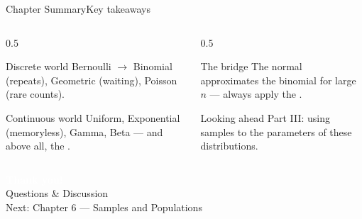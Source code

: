 \documentclass[aspectratio=169,11pt]{beamer}
\begin{document}
\begin{frame}{Chapter Summary}{Key takeaways}
  \begin{columns}[T]
    \begin{column}{0.5\textwidth}
      \begin{block}{Discrete world}
        \small Bernoulli $\to$ Binomial (repeats), Geometric (waiting),
        Poisson (rare counts).
      \end{block}
      \begin{exampleblock}{Continuous world}
        \small Uniform, Exponential (memoryless), Gamma, Beta — and above
        all, the .
      \end{exampleblock}
    \end{column}
    \begin{column}{0.5\textwidth}
      \begin{alertblock}{The bridge}
        \small The normal approximates the binomial for large $n$ — always
        apply the .
      \end{alertblock}
      \begin{block}{Looking ahead}
        \small Part III: using samples to  the parameters of
        these distributions.
      \end{block}
    \end{column}
  \end{columns}
\end{frame}

{
\begin{frame}
  \vfill
  \begin{center}
    {\LARGE\textcolor{white}{\textbf{Thank you!}}}\\[0.6em]
    {\small\textcolor{PrimaryLight}{Questions \& Discussion}}\\[1.2em]
    {\footnotesize\textcolor{AccentYellow}{Next: Chapter 6 — Samples and Populations}}
  \end{center}
  \vfill
\end{frame}}
\end{document}
